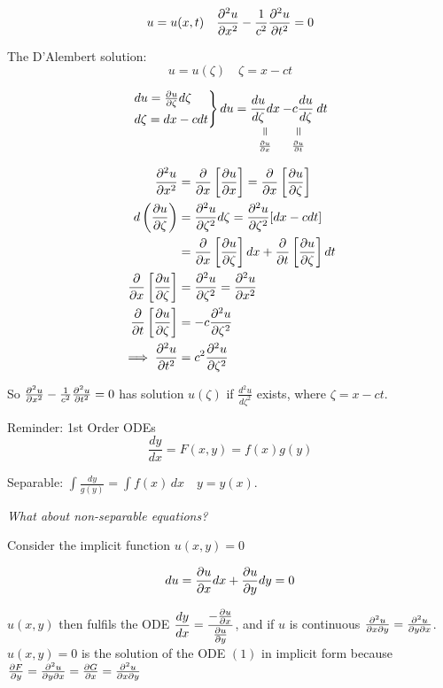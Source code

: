 \documentclass[10pt]{scrartcl}
\begin{document}

\[u = u(x,t) \quad \frac{\partial^2u}{\partial x^2} - \frac{1}{c^2}\frac{\partial^2u}{\partial t^2} = 0\]

The D'Alembert solution:
\[\boxed{u = u(\zeta) \quad \zeta = x -ct}\]

\[
\begin{rcases*}
du = \frac{\del u}{\del \zeta} d\zeta\\
d\zeta = dx - cdt	
\end{rcases*}
du = \equalto{\frac{du}{d\zeta}dx}{\frac{\del u}{\del x}} \equalto{- c\frac{du}{d\zeta}}{\frac{\del u}{\del t}}dt
\]

\[
\begin{aligned}
  \frac{\partial^2u}{\partial x^2} &= \frac{\partial}{\partial x}\left[\frac{\partial u}{\partial x}\right] = \frac{\partial}{\partial x}\left[\frac{\partial u}{\partial \zeta}\right]\\
  d\left(\frac{\partial u}{\partial \zeta}\right) &=  \frac{\partial^2u}{\partial \zeta^2}d\zeta = \frac{\partial^2u}{\partial \zeta^2}[dx - cdt]\\
  &= \frac{\partial}{\partial x}\left[\frac{\partial u}{\partial \zeta}\right]dx + \frac{\partial}{\partial t}\left[\frac{\partial u}{\partial \zeta}\right]dt\\
  \frac{\partial}{\partial x}\left[\frac{\partial u}{\partial \zeta}\right] &= \frac{\partial^2u}{\partial \zeta^2} = \frac{\partial^2u}{\partial x^2}\\
  \frac{\partial}{\partial t}\left[\frac{\partial u}{\partial \zeta}\right] &= -c\frac{\partial^2u}{\partial \zeta^2}\\
  \implies \frac{\partial^2u}{\partial t^2} &= c^2\frac{\partial^2u}{\partial \zeta^2}
\end{aligned}
\]

So $\frac{\partial^2u}{\partial x^2} -\frac{1}{c^2}\frac{\partial^2u}{\partial t^2} = 0$ has solution $u(\zeta)$ if $\frac{d^2u}{d\zeta^2}$ exists, where $\zeta = x-ct$. 

Reminder: 1st Order ODEs
\[\frac{dy}{dx} = F(x,y) = f(x)g(y)\]

Separable: $\displaystyle{\int \frac{dy}{g(y)} = \int f(x)\,dx\quad y = y(x)}$. 

\emph{What about non-separable equations?}

Consider the implicit function $u(x,y) = 0$

\[du = \frac{\partial u}{\partial x}dx + \frac{\partial u}{\partial y}dy = 0\]

$u(x,y)$ then fulfils the ODE $\dfrac{dy}{dx} = \dfrac{-\frac{\partial u}{\partial x}}{\frac{\partial u}{\partial y}}$, and if $u$ is continuous $\frac{\partial^2u}{\partial x\partial y}= \tfrac{\partial^2u}{\partial y\partial x}$. $u(x,y) = 0$ is the solution of the ODE $(1)$ in implicit form because $\frac{\partial F}{\partial y} = \frac{\partial^2u}{\partial y\partial x} = \frac{\partial G}{\partial x} = \frac{\partial^2u}{\partial x\partial y}$\\
\end{document}
